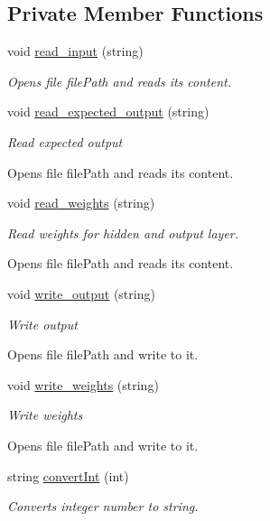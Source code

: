 \subsection*{Private Member Functions}
\begin{DoxyCompactItemize}
\item 
void \hyperlink{a00001_a1134b607af353e187667aaba1a960bdd}{read\-\_\-input} (string)
\begin{DoxyCompactList}\small\item\em Opens file file\-Path and reads its content. \end{DoxyCompactList}\item 
void \hyperlink{a00001_a4b0a0ad74a4446e5f23020521200b932}{read\-\_\-expected\-\_\-output} (string)
\begin{DoxyCompactList}\small\item\em Read expected output\par
 Opens file file\-Path and reads its content. \end{DoxyCompactList}\item 
void \hyperlink{a00001_a7d2759b2ad892445e7d74892737547cf}{read\-\_\-weights} (string)
\begin{DoxyCompactList}\small\item\em Read weights for hidden and output layer.\par
 Opens file file\-Path and reads its content. \end{DoxyCompactList}\item 
void \hyperlink{a00001_a4e104949ad8e8fd75c612313f857ee5a}{write\-\_\-output} (string)
\begin{DoxyCompactList}\small\item\em Write output\par
 Opens file file\-Path and write to it. \end{DoxyCompactList}\item 
void \hyperlink{a00001_a67e37c5e1429df91a8c4ff836579cdc0}{write\-\_\-weights} (string)
\begin{DoxyCompactList}\small\item\em Write weights\par
 Opens file file\-Path and write to it. \end{DoxyCompactList}\item 
string \hyperlink{a00001_a6b29a9f88396627c1d39170723bad7fd}{convert\-Int} (int)
\begin{DoxyCompactList}\small\item\em Converts integer number to string. \end{DoxyCompactList}\end{DoxyCompactItemize}
